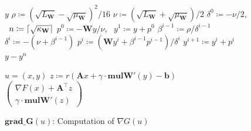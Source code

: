 \documentclass{article}
\DeclarePairedDelimiter\ceil{\lceil}{\rceil}
\newcommand{\R}{\mathbb{R}}
\newcommand{\sX}{\R^d}
\newcommand{\sY}{\R^m}
\newcommand{\mA}{\mathbf{A}}
\newcommand{\mW}{\mathbf{W}}
\newcommand{\pW}{\mathbf{W'}}
\newcommand{\mb}{\mathbf{b}}
\newcommand{\eqdef}{\coloneqq}
\newcommand{\mulpW}{\mathrm{\mathbf{mul}\pW}}
\newcommand{\gradG}{\mathrm{\mathbf{grad\_G}}}
\newcommand{\pmat}[1]{\begin{pmatrix}#1\end{pmatrix}}
\newcommand{\cbraces}[1]{\left( #1 \right)}
\begin{document}

\begin{figure}[t!]
\begin{minipage}{.482\textwidth}
  \begin{algorithm}[H]
    \caption{$\mulpW(y)$: Multiplication by $\pW$}
  	\label{alg:mult_pW}
  	\begin{algorithmic}[1]
  		 $y$ %
      \State $\rho\eqdef \cbraces{\sqrt{L_\mW}-\sqrt{\mu_\mW}}^2/16$
      \State $\nu\eqdef\cbraces{\sqrt{L_\mW}+\sqrt{\mu_\mW}}/2$
  		\State $\delta^0 \eqdef -\nu/2$, \ $n \eqdef \ceil{\sqrt{\kappa_\mW}}$
      \State $p^0 \eqdef -\mW y/\nu$, \ $y^1 \eqdef y + p^0$
  		\State $\beta^{i-1}\eqdef\rho/\delta^{i-1}$
  		\State $\delta^i\eqdef-(\nu+\beta^{i-1})$
  		\State $p^i\eqdef\cbraces{\mW y^{i}+\beta^{i-1}p^{i-1}}/\delta^i$
  		\State $y^{i+1}\eqdef y^i+p^i$
  		\EndFor
  	 $y - y^n$
  	\end{algorithmic}
  \end{algorithm}
  \vspace{-0.7cm}
  \begin{algorithm}[H]
    \caption{$\gradG(u)$: Computation of $\nabla G(u)$}
  	\label{alg:gradG}
  	\begin{algorithmic}[1]
  		 $u = (x, y)$ %
      \State $z \eqdef r\cbraces{\mA x + \gamma \cdot\mulpW(y) - \mb}$
         $\pmat{\nabla F(x) + \mA^\top z \\ \gamma\cdot \mulpW(z)}$
  	\end{algorithmic}
  \end{algorithm}


\end{minipage}
\end{figure}
\end{document}
